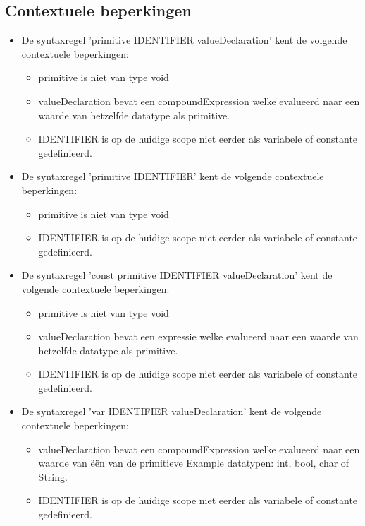     \subsection{Contextuele beperkingen}
        \begin{itemize}
        \item De syntaxregel 'primitive IDENTIFIER valueDeclaration' kent de volgende contextuele beperkingen:
            \begin{itemize}
            \item primitive is niet van type void
            \item valueDeclaration bevat een compoundExpression welke evalueerd naar een waarde van hetzelfde datatype als primitive.
            \item IDENTIFIER is op de huidige scope niet eerder als variabele of constante gedefinieerd.
            \end{itemize}        
        \item De syntaxregel 'primitive IDENTIFIER' kent de volgende contextuele beperkingen:
            \begin{itemize}
            \item primitive is niet van type void
            \item IDENTIFIER is op de huidige scope niet eerder als variabele of constante gedefinieerd.
            \end{itemize}  
        \item De syntaxregel 'const primitive IDENTIFIER valueDeclaration' kent de volgende contextuele beperkingen:
            \begin{itemize}
            \item primitive is niet van type void
            \item valueDeclaration bevat een expressie welke evalueerd naar een waarde van hetzelfde datatype als primitive.
            \item IDENTIFIER is op de huidige scope niet eerder als variabele of constante gedefinieerd.
            \end{itemize}  
        \item De syntaxregel 'var IDENTIFIER valueDeclaration' kent de volgende contextuele beperkingen:
            \begin{itemize}
            \item valueDeclaration bevat een compoundExpression welke evalueerd naar een waarde van \"{e}\"{e}n van de primitieve Example datatypen: int, bool, char of String.
            \item IDENTIFIER is op de huidige scope niet eerder als variabele of constante gedefinieerd.

\end{itemize}
\end{itemize}
